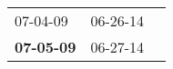 \begin{supertabular}{p{0.33\columnwidth}p{0.33\columnwidth}p{0.33\columnwidth}}
          07-04-09\textsuperscript{} &  06-26-14\textsuperscript{} \\
 \textbf{07-05-09\textsuperscript{}} &  06-27-14\textsuperscript{} \\
\end{supertabular}
